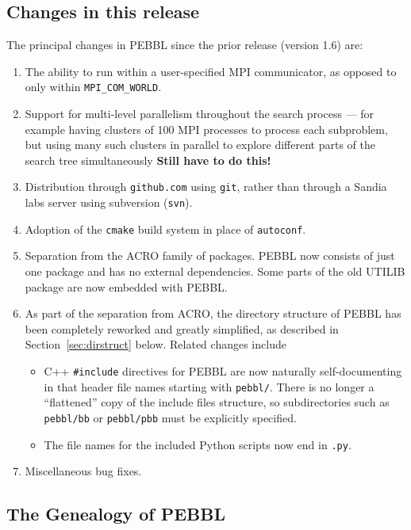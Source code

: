 \subsection{Changes in this release}
The principal changes in PEBBL since the prior release (version 1.6) are:
\begin{enumerate}
\item The ability to run within a user-specified MPI communicator, as opposed
to only within \texttt{MPI\_COM\_WORLD}.
\item Support for multi-level parallelism throughout the search process ---
for example having clusters of 100 MPI processes to process each subproblem,
but using many such clusters in parallel to explore different parts of the
search tree simultaneously \textbf{Still have to do this!}
\item Distribution through \texttt{github.com} using \texttt{git}, rather than
through a Sandia labs server using subversion (\texttt{svn}).
\item Adoption of the \texttt{cmake} build system in place of \texttt{autoconf}.
\item Separation from the ACRO family of packages.  PEBBL now consists of just
one package and has no external dependencies.  Some parts of the old UTILIB
package are now embedded with PEBBL.
\item As part of the separation from ACRO, the directory structure of PEBBL
has been completely reworked and greatly simplified, as described in
Section~\ref{sec:dirstruct} below.  Related changes include
\begin{itemize}
\item C++ \texttt{\#include} directives for PEBBL are now naturally
self-documenting in that header file names starting with \texttt{pebbl/}.
There is no longer a ``flattened'' copy of the include files structure, so
subdirectories such as \texttt{pebbl/bb} or \texttt{pebbl/pbb} must be
explicitly specified.
\item The file names for the included Python scripts now end in \texttt{.py}.
\end{itemize}
\item Miscellaneous bug fixes.
\end{enumerate}


\subsection{The Genealogy of PEBBL}

